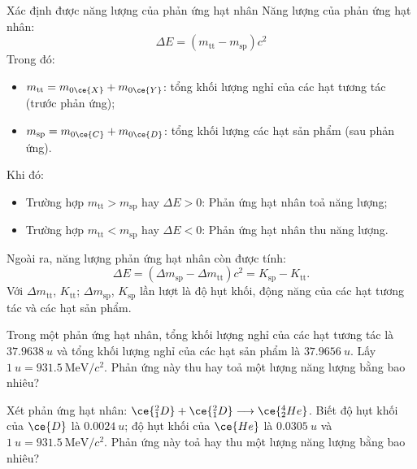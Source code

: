 \begin{dang}{Xác định được năng lượng của phản ứng hạt nhân}
		Năng lượng của phản ứng hạt nhân:
		\begin{equation}
			\Delta E=\left(m_\text{tt}-m_\text{sp}\right)c^2
		\end{equation}
		Trong đó:
		\begin{itemize}
			\item $m_\text{tt}=m_{0\ce{X}}+m_{0\ce{Y}}$: tổng khối lượng nghỉ của các hạt tương tác (trước phản ứng);
			\item $m_\text{sp}=m_{0\ce{C}}+m_{0\ce{D}}$: tổng khối lượng các hạt sản phẩm (sau phản ứng).
		\end{itemize}
		Khi đó:
		\begin{itemize}
			\item Trường hợp $m_\text{tt}>m_\text{sp}$ hay $\Delta E>0$: Phản ứng hạt nhân toả năng lượng;
			\item Trường hợp $m_\text{tt}<m_\text{sp}$ hay $\Delta E<0$: Phản ứng hạt nhân thu năng lượng.
		\end{itemize}
		Ngoài ra, năng lượng phản ứng hạt nhân còn được tính:
		$$\Delta E=\left(\Delta m_\text{sp}-\Delta m_\text{tt}\right)c^2=K_\text{sp}-K_\text{tt}.$$
		Với $\Delta m_\text{tt}$, $K_\text{tt}$; $\Delta m_\text{sp}$, $K_\text{sp}$ lần lượt là độ hụt khối, động năng của các hạt tương tác và các hạt sản phẩm.
\end{dang}
\begin{vd}
	Trong một phản ứng hạt nhân, tổng khối lượng nghỉ của các hạt tương tác là $\SI{37.9638}{u}$ và tổng khối lượng nghỉ của các hạt sản phẩm là $\SI{37.9656}{u}$. Lấy $\SI{1}{u}=\SI{931.5}{\mega\electronvolt/c^2}$. Phản ứng này thu hay toả một lượng năng lượng bằng bao nhiêu?
\end{vd}
\begin{vd}
	Xét phản ứng hạt nhân: $\ce{^2_1D}+\ce{^2_1D}\longrightarrow\ce{^4_2He}$. Biết độ hụt khối của $\ce{D}$ là $\SI{0.0024}{u}$; độ hụt khối của $\ce{He}$ là $\SI{0.0305}{u}$ và $\SI{1}{u}=\SI{931.5}{\mega\electronvolt/c^2}$. Phản ứng này toả hay thu một lượng năng lượng bằng bao nhiêu?
\end{vd}
